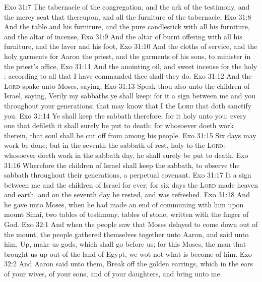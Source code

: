 \vs Exo 31:7 The tabernacle of the congregation, and the ark of the testimony, and the mercy seat that  thereupon, and all the furniture of the tabernacle,
\vs Exo 31:8 And the table and his furniture, and the pure candlestick with all his furniture, and the altar of incense,
\vs Exo 31:9 And the altar of burnt offering with all his furniture, and the laver and his foot,
\vs Exo 31:10 And the cloths of service, and the holy garments for Aaron the priest, and the garments of his sons, to minister in the priest's office,
\vs Exo 31:11 And the anointing oil, and sweet incense for the holy : according to all that I have commanded thee shall they do.
\vs Exo 31:12 And the \textsc{Lord} spake unto Moses, saying,
\vs Exo 31:13 Speak thou also unto the children of Israel, saying, Verily my sabbaths ye shall keep: for it  a sign between me and you throughout your generations; that  may know that I  the \textsc{Lord} that doth sanctify you.
\vs Exo 31:14 Ye shall keep the sabbath therefore; for it  holy unto you: every one that defileth it shall surely be put to death: for whosoever doeth  work therein, that soul shall be cut off from among his people.
\vs Exo 31:15 Six days may work be done; but in the seventh  the sabbath of rest, holy to the \textsc{Lord}: whosoever doeth  work in the sabbath day, he shall surely be put to death.
\vs Exo 31:16 Wherefore the children of Israel shall keep the sabbath, to observe the sabbath throughout their generations,  a perpetual covenant.
\vs Exo 31:17 It  a sign between me and the children of Israel for ever: for  six days the \textsc{Lord} made heaven and earth, and on the seventh day he rested, and was refreshed.
\vs Exo 31:18 And he gave unto Moses, when he had made an end of communing with him upon mount Sinai, two tables of testimony, tables of stone, written with the finger of God.
\vs Exo 32:1 And when the people saw that Moses delayed to come down out of the mount, the people gathered themselves together unto Aaron, and said unto him, Up, make us gods, which shall go before us; for  this Moses, the man that brought us up out of the land of Egypt, we wot not what is become of him.
\vs Exo 32:2 And Aaron said unto them, Break off the golden earrings, which  in the ears of your wives, of your sons, and of your daughters, and bring  unto me.
